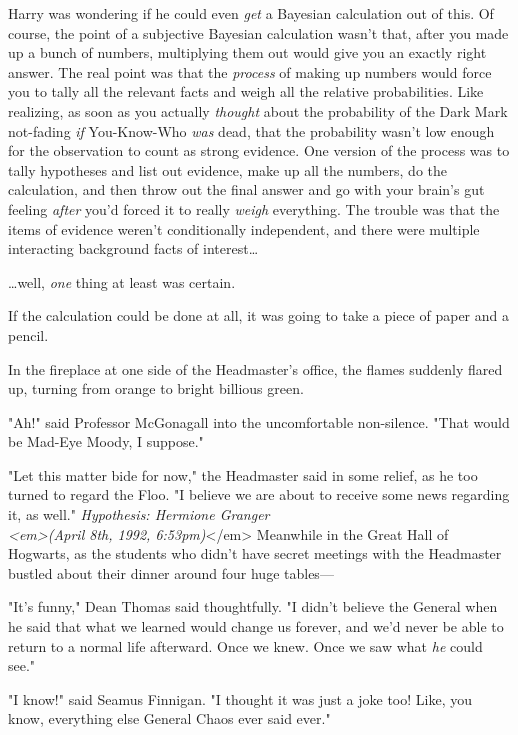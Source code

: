 Harry was wondering if he could even \emph{get} a Bayesian calculation out of this. Of course, the point of a subjective Bayesian calculation wasn't that, after you made up a bunch of numbers, multiplying them out would give you an exactly right answer. The real point was that the \emph{process} of making up numbers would force you to tally all the relevant facts and weigh all the relative probabilities. Like realizing, as soon as you actually \emph{thought} about the probability of the Dark Mark not-fading \emph{if} You-Know-Who \emph{was} dead, that the probability wasn't low enough for the observation to count as strong evidence. One version of the process was to tally hypotheses and list out evidence, make up all the numbers, do the calculation, and then throw out the final answer and go with your brain's gut feeling \emph{after} you'd forced it to really \emph{weigh} everything. The trouble was that the items of evidence weren't conditionally independent, and there were multiple interacting background facts of interest{\ldots}

{\ldots}well, \emph{one} thing at least was certain.

If the calculation could be done at all, it was going to take a piece of paper and a pencil.

In the fireplace at one side of the Headmaster's office, the flames suddenly flared up, turning from orange to bright billious green.

"Ah!" said Professor McGonagall into the uncomfortable non-silence. "That would be Mad-Eye Moody, I suppose."

"Let this matter bide for now," the Headmaster said in some relief, as he too turned to regard the Floo. "I believe we are about to receive some news regarding it, as well."
\sbreak
\emph{Hypothesis: Hermione Granger\\
<em>(April 8th, 1992, 6:53pm)}</em>
\sbreak
Meanwhile in the Great Hall of Hogwarts, as the students who didn't have secret meetings with the Headmaster bustled about their dinner around four huge tables---

"It's funny," Dean Thomas said thoughtfully. "I didn't believe the General when he said that what we learned would change us forever, and we'd never be able to return to a normal life afterward. Once we knew. Once we saw what \emph{he} could see."

"I know!" said Seamus Finnigan. "I thought it was just a joke too! Like, you know, everything else General Chaos ever said ever."

